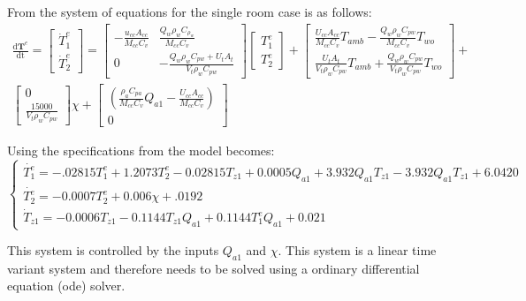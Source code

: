 \documentclass[letterpaper,12pt]{article}   %
\begin{document}
From \cite{Reppa2015} the system of equations for the single room case is as follows:
\begin{multline*}
    \label{eq:HVAC-Modeling}
    \frac{\mathrm{d}\mathbf{T}^e}{\mathrm{dt}} = 
    \begin{bmatrix}
    \dot{T}_1^e\\
    \dot{T}_2^e    
    \end{bmatrix}
    = 
    \begin{bmatrix}
    -\frac{u_{cc}A_{cc}}{M_{cc}C_v} & \frac{Q_w\rho_w C_{\rho_w}}{M_{cc}C_v}\\
    0 &  -\frac{Q_w\rho_wC_{pw}+U_tA_t}{V_t\rho_wC_{pw}}
    \end{bmatrix}
    \begin{bmatrix}
    T_1^e\\
    T_2^e
    \end{bmatrix}
    +
    \begin{bmatrix}
    \frac{U_{cc}A_{cc}}{M_{cc}C_v}T_{amb} - \frac{Q_w\rho_wC_{pw}}{M_{cc}C_v}T_{wo} \\
    \frac{U_tA_t}{V_t\rho_wC_{pw}}T_{amb} + \frac{Q_w\rho_wC_{pw}}{V_t\rho_wC_{pw}}T_{wo}
    \end{bmatrix}
    +\\
    \begin{bmatrix}
    0 \\
    \frac{15000}{V_t\rho_wC_{pw}}
    \end{bmatrix}
    \chi
    +
    \begin{bmatrix}
    (\frac{\rho_aC_{pa}}{M_{cc}C_v}Q_{a1}-\frac{U_{cc}A_{cc}}{M_{cc}C_v})\\
    0
    \end{bmatrix}    
\end{multline*}

Using the specifications from \cite{Reppa2015} the model becomes:
\begin{equation*}
    \begin{cases} \dot{T_1^e} = -.02815T_1^e + 1.2073T_2^e -0.02815T_{z1} + 0.0005Q_{a1} + 3.932Q_{a1}T_{z1}-3.932Q_{a1}T_{z1}+6.0420\\ \dot{T_2^e} = -0.0007T_2^e + 0.006\chi +.0192 \\ \dot{T}_{z1} = -0.0006T_{z1} - 0.1144T_{z1}Q_{a1} + 0.1144T_1^eQ_{a1} + 0.021\end{cases}
\end{equation*}

This system is controlled by the inputs $Q_{a1}$ and $\chi$. This system is a linear time variant system and therefore needs to be solved using a ordinary differential equation (ode) solver. 
\end{document}
